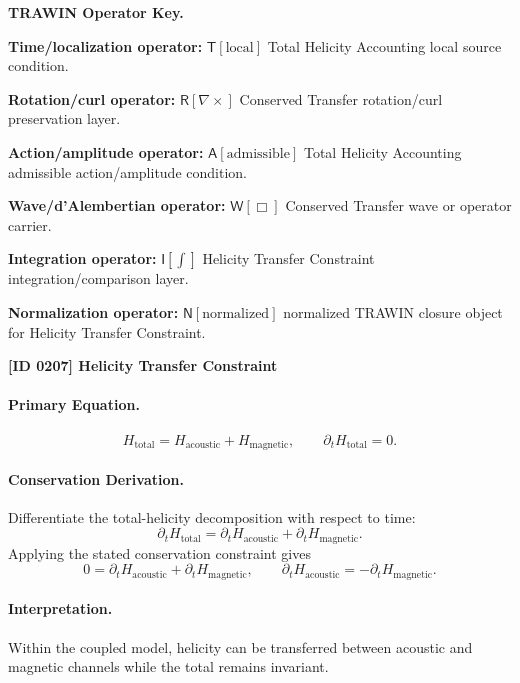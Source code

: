 \par\vspace{0.45\baselineskip}
\noindent\begin{minipage}[t]{\linewidth}
\begingroup
\small
\raggedright
\textbf{TRAWIN Operator Key.}\par
\noindent\textbf{Time/localization operator:} $\mathsf{T}\!\left[\mathrm{local}\right]$ Total Helicity Accounting local source condition.\par
\noindent\textbf{Rotation/curl operator:} $\mathsf{R}\!\left[\nabla\times\right]$ Conserved Transfer rotation/curl preservation layer.\par
\noindent\textbf{Action/amplitude operator:} $\mathsf{A}\!\left[\mathrm{admissible}\right]$ Total Helicity Accounting admissible action/amplitude condition.\par
\noindent\textbf{Wave/d'Alembertian operator:} $\mathsf{W}\!\left[\Box\right]$ Conserved Transfer wave or operator carrier.\par
\noindent\textbf{Integration operator:} $\mathsf{I}\!\left[\int\right]$ Helicity Transfer Constraint integration/comparison layer.\par
\noindent\textbf{Normalization operator:} $\mathsf{N}\!\left[\mathrm{normalized}\right]$ normalized TRAWIN closure object for Helicity Transfer Constraint.\par
\endgroup
\end{minipage}

\clearpage
\noindent\textbf{[ID 0207] Helicity Transfer Constraint}\par
\vspace{0.35em}
\paragraph{Primary Equation.}
\[
H_{\mathrm{total}}=H_{\mathrm{acoustic}}+H_{\mathrm{magnetic}},\qquad \partial_t H_{\mathrm{total}}=0.
\]
\paragraph{Conservation Derivation.}
Differentiate the total-helicity decomposition with respect to time:
\[
\partial_t H_{\mathrm{total}}=\partial_t H_{\mathrm{acoustic}}+\partial_t H_{\mathrm{magnetic}}.
\]
Applying the stated conservation constraint gives
\[
0=\partial_t H_{\mathrm{acoustic}}+\partial_t H_{\mathrm{magnetic}},\qquad \partial_t H_{\mathrm{acoustic}}=-\partial_t H_{\mathrm{magnetic}}.
\]
\paragraph{Interpretation.}
Within the coupled model, helicity can be transferred between acoustic and magnetic channels while the total remains invariant.

